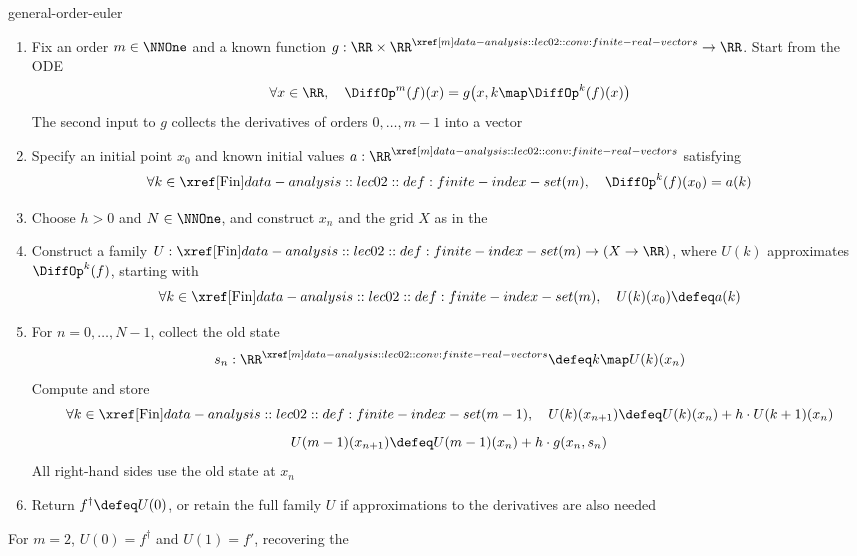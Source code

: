 \documentclass[12pt]{article}
\numberwithin{figure}{section}
\begin{document}
\begin{conv}{general-order-euler}
\begin{enumerate}[nosep]
\item Fix an order $m\in\NNOne$ and a known function
  $g:\RR\times\RealVectors{m}\to\RR$. Start from the ODE
  \[
    \forall x\in\RR,\quad
    \DiffOp^m(f)(x)
      =g\bigl(x,k\map\DiffOp^k(f)(x)\bigr)
  \]
  The second input to $g$ collects the derivatives of orders
  $0,\ldots,m-1$ into a vector
\item Specify an initial point $x_0$ and known initial values
  $a:\RealVectors{m}$ satisfying
  \[
    \forall k\in\Fin(m),\quad \DiffOp^k(f)(x_0)=a(k)
  \]
\item Choose $h>0$ and $N\in\NNOne$, and construct $x_n$ and the grid
  $X$ as in the 
\item Construct a family $U:\Fin(m)\to(X\to\RR)$, where $U(k)$
  approximates $\DiffOp^k(f)$, starting with
  \[
    \forall k\in\Fin(m),\quad U(k)(x_0)\defeq a(k)
  \]
\item For $n=0,\ldots,N-1$, collect the old state
  \[
    s_n:\RealVectors{m}\defeq k\map U(k)(x_n)
  \]
  Compute and store
  \[
    \forall k\in\Fin(m-1),\quad
    U(k)(x_{n+1})\defeq U(k)(x_n)+h\cdot U(k+1)(x_n)
  \]
  \[
    U(m-1)(x_{n+1})\defeq U(m-1)(x_n)+h\cdot g(x_n,s_n)
  \]
  All right-hand sides use the old state at $x_n$
\item Return $f^\dagger\defeq U(0)$, or retain the full family $U$
  if approximations to the derivatives are also needed
\end{enumerate}
  For $m=2$, $U(0)=f^\dagger$ and $U(1)=f'$, recovering the
\end{conv}

\end{document}
